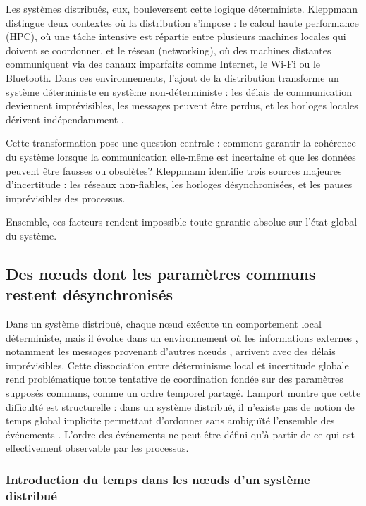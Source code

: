 \documentclass[12pt,a4paper]{article}
\begin{document}
\vspace{0.25cm}
Les systèmes distribués, eux, bouleversent cette logique déterministe. Kleppmann distingue deux contextes où la distribution s'impose : le calcul haute performance (HPC), où une tâche intensive est répartie entre plusieurs machines locales qui doivent se coordonner, et le réseau (networking), où des machines distantes communiquent via des canaux imparfaits comme Internet, le Wi-Fi ou le Bluetooth. Dans ces environnements, l'ajout de la distribution transforme un système déterministe en système non-déterministe : les délais de communication deviennent imprévisibles, les messages peuvent être perdus, et les horloges locales dérivent indépendamment \cite[p.~274]{Kleppmann2017}.

\vspace{0.25cm}
Cette transformation pose une question centrale : comment garantir la cohérence du système lorsque la communication elle-même est incertaine et que les données peuvent être fausses ou obsolètes? Kleppmann identifie trois sources majeures d'incertitude : les réseaux non-fiables, les horloges désynchronisées, et les pauses imprévisibles des processus.

\vspace{0.25cm}
Ensemble, ces facteurs rendent impossible toute garantie absolue sur l'état global du système.

\subsection{Des nœuds dont les paramètres communs restent désynchronisés}

Dans un système distribué, chaque nœud exécute un comportement local déterministe, mais il évolue dans un environnement où les informations externes , notamment les messages provenant d’autres nœuds , arrivent avec des délais imprévisibles. Cette dissociation entre déterminisme local et incertitude globale rend problématique toute tentative de coordination fondée sur des paramètres supposés communs, comme un ordre temporel partagé. Lamport montre que cette difficulté est structurelle : dans un système distribué, il n’existe pas de notion de temps global implicite permettant d’ordonner sans ambiguïté l’ensemble des événements \cite{Lamport1978}. L’ordre des événements ne peut être défini qu’à partir de ce qui est effectivement observable par les processus.

\subsubsection{Introduction du temps dans les nœuds d'un système distribué}
\end{document}

